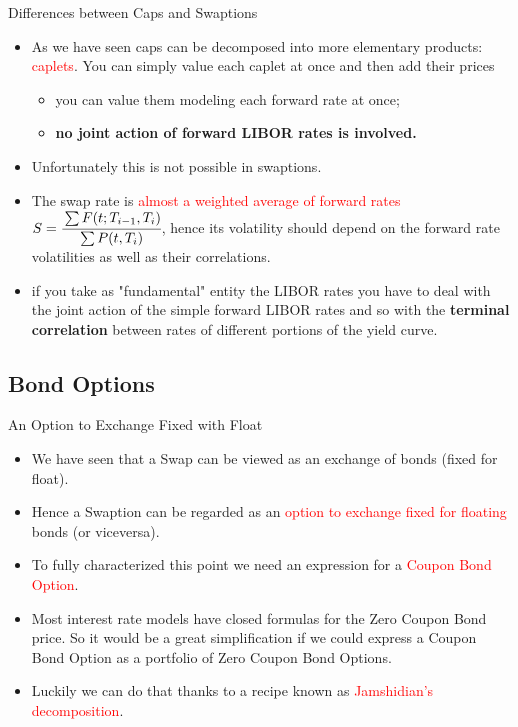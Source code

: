 \documentclass{beamer}
\begin{document}
\begin{frame}{Differences between Caps and Swaptions}
\begin{itemize}
	\item As we have seen caps can be decomposed into more elementary products: \textcolor{red}{caplets}. You can simply value each caplet at once and then add their prices
	\begin{itemize}
		\item you can value them modeling each forward rate at once;
		\item \textbf{no joint action of forward LIBOR rates is involved.}
	\end{itemize}
	\item Unfortunately this is not possible in swaptions.
	\item The swap rate is \textcolor{red}{almost a weighted average of forward rates} $S=\cfrac{\sum F(t;T_{i-1},T_i)}{\sum P(t,T_i)}$, hence its volatility should depend on the forward rate volatilities as well as their correlations.
	\item if you take as "fundamental" entity the LIBOR rates you have to deal with the joint action of the simple forward LIBOR rates and so with the \textbf{terminal correlation} between rates of different portions of the yield curve. 
\end{itemize}
\end{frame}

\subsection{Bond Options}
\begin{frame}{An Option to Exchange Fixed with Float}
\begin{itemize}
	\item We have seen that a Swap can be viewed as an exchange of bonds (fixed for float).
	\item Hence a Swaption can be regarded as an \textcolor{red}{option to exchange fixed for floating} bonds (or viceversa).
	\item To fully characterized this point we need an expression for a \textcolor{red}{Coupon Bond Option}.
	\item Most interest rate models have closed formulas for the Zero Coupon Bond price. So it would be a great simplification if we could express a Coupon Bond Option as a portfolio of Zero Coupon Bond Options.
	\item Luckily we can do that thanks to a recipe known as \textcolor{red}{Jamshidian's decomposition}.
\end{itemize}
\end{frame}
\end{document}
